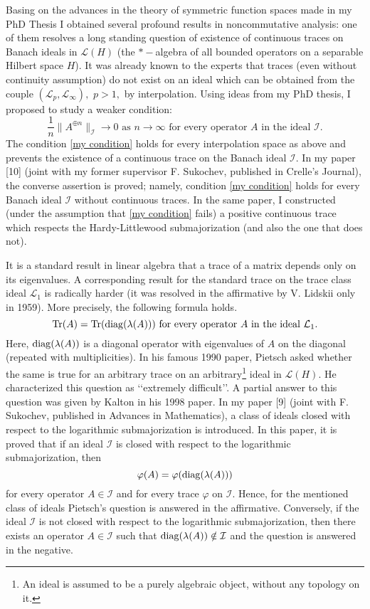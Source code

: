 \documentclass[a4paper]{amsart}
\begin{document}
Basing on the advances in the theory of symmetric function spaces made in my PhD Thesis I obtained several profound results in noncommutative analysis: one of them resolves a long standing question of existence of continuous traces on Banach ideals in $\mathcal{L}(H)$ (the $*-$algebra of all bounded operators on a separable Hilbert space $H$). It was already known to the experts that traces (even without continuity assumption) do not exist on an ideal which can be obtained from the couple $(\mathcal{L}_p,\mathcal{L}_{\infty}),$ $p>1,$ by interpolation. Using ideas from my PhD thesis, I proposed to study a weaker condition:
\begin{equation}\label{my condition}
\frac1n\|A^{\oplus n}\|_{\mathcal{I}}\to0\mbox{ as }n\to\infty\mbox{ for every operator }A\mbox{ in the ideal }\mathcal{I}.
\end{equation}
The condition \eqref{my condition} holds for every interpolation space as above and prevents the existence of a continuous trace on the Banach ideal $\mathcal{I}.$ In my paper [10] (joint with my former supervisor F. Sukochev, published in Crelle's Journal), the converse assertion is proved; namely, condition \eqref{my condition} holds for every Banach ideal $\mathcal{I}$ without continuous traces. In the same paper, I constructed (under the assumption that \eqref{my condition} fails) a positive continuous trace which respects the Hardy-Littlewood submajorization (and also the one that does not). 

It is a standard result in linear algebra that a trace of a matrix depends only on its eigenvalues. A corresponding result for the standard trace on the trace class ideal $\mathcal{L}_1$ is radically harder (it was resolved in the affirmative by V. Lidskii only in 1959). More precisely, the following formula holds.
$${\rm Tr}(A)={\rm Tr}({\rm diag}(\lambda(A)))\mbox{ for every operator }A\mbox{ in the ideal }\mathcal{L}_1.$$
Here, ${\rm diag}(\lambda(A))$ is a diagonal operator with eigenvalues of $A$ on the diagonal (repeated with multiplicities). In his famous 1990 paper, Pietsch asked  whether the same is true for an arbitrary trace on an arbitrary\footnote{An ideal is assumed to be a purely algebraic object, without any topology on it.} ideal in $\mathcal{L}(H).$ He characterized this question as \lq\lq extremely difficult\rq\rq. A partial answer to this question was given by Kalton in his 1998 paper. In my paper [9] (joint with F. Sukochev, published in Advances in Mathematics), a class of ideals closed with respect to the logarithmic submajorization is introduced. In this paper, it is proved that if an ideal $\mathcal{I}$ is closed with respect to the logarithmic submajorization, then
$$\varphi(A)=\varphi({\rm diag}(\lambda(A)))$$
for every operator $A\in\mathcal{I}$ and for every trace $\varphi$ on $\mathcal{I}.$ Hence, for the mentioned class of ideals Pietsch's question is answered in the affirmative. Conversely, if the ideal $\mathcal{I}$ is not closed with respect to the logarithmic submajorization, then there exists an operator $A\in\mathcal{I}$ such that ${\rm diag}(\lambda(A))\notin\mathcal{I}$ and the question is answered in the negative.
\end{document}
